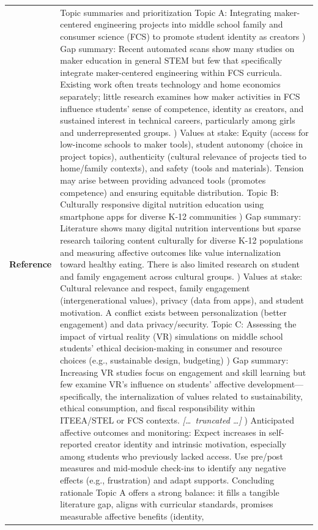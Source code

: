 \begin{longtable}{@{}l p{13cm}@{}}
  \textbf{Reference} & Topic summaries and prioritization \newline Topic A: Integrating maker-centered engineering projects into middle school family and consumer science (FCS) to promote student identity as creators \newline 1) Gap summary: Recent automated scans show many studies on maker education in general STEM but few that specifically integrate maker-centered engineering within FCS curricula. Existing work often treats technology and home economics separately; little research examines how maker activities in FCS influence students' sense of competence, identity as creators, and sustained interest in technical careers, particularly among girls and underrepresented groups. \newline 2) Values at stake: Equity (access for low-income schools to maker tools), student autonomy (choice in project topics), authenticity (cultural relevance of projects tied to home/family contexts), and safety (tools and materials). Tension may arise between providing advanced tools (promotes competence) and ensuring equitable distribution. \newline Topic B: Culturally responsive digital nutrition education using smartphone apps for diverse K-12 communities \newline 1) Gap summary: Literature shows many digital nutrition interventions but sparse research tailoring content culturally for diverse K-12 populations and measuring affective outcomes like value internalization toward healthy eating. There is also limited research on student and family engagement across cultural groups. \newline 2) Values at stake: Cultural relevance and respect, family engagement (intergenerational values), privacy (data from apps), and student motivation. A conflict exists between personalization (better engagement) and data privacy/security. \newline Topic C: Assessing the impact of virtual reality (VR) simulations on middle school students' ethical decision-making in consumer and resource choices (e.g., sustainable design, budgeting) \newline 1) Gap summary: Increasing VR studies focus on engagement and skill learning but few examine VR's influence on students' affective development---specifically, the internalization of values related to sustainability, ethical consumption, and fiscal responsibility within ITEEA/STEL or FCS contexts. \newline \textit{[\ldots\ truncated \ldots]} \newline 5) Anticipated affective outcomes and monitoring: Expect increases in self-reported creator identity and intrinsic motivation, especially among students who previously lacked access. Use pre/post measures and mid-module check-ins to identify any negative effects (e.g., frustration) and adapt supports. \newline Concluding rationale \newline Topic A offers a strong balance: it fills a tangible literature gap, aligns with curricular standards, promises measurable affective benefits (identity, 
\end{longtable}
